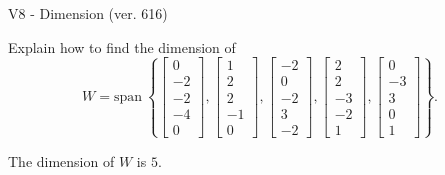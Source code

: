 \begin{exercise}
  \begin{exerciseTitle}V8 - Dimension (ver. 616)\end{exerciseTitle}
  \begin{exerciseStatement}
    Explain how to find the dimension of 
\[W=\mathrm{span}\ \left\{\left[\begin{array}{r}
0 \\
-2 \\
-2 \\
-4 \\
0
\end{array}\right] , \left[\begin{array}{r}
1 \\
2 \\
2 \\
-1 \\
0
\end{array}\right] , \left[\begin{array}{r}
-2 \\
0 \\
-2 \\
3 \\
-2
\end{array}\right] , \left[\begin{array}{r}
2 \\
2 \\
-3 \\
-2 \\
1
\end{array}\right] , \left[\begin{array}{r}
0 \\
-3 \\
3 \\
0 \\
1
\end{array}\right]\right\}.\]



  \end{exerciseStatement}
  \begin{exerciseAnswer}
   The dimension of \(W\) is  \(5\).
  


  \end{exerciseAnswer}
\end{exercise}